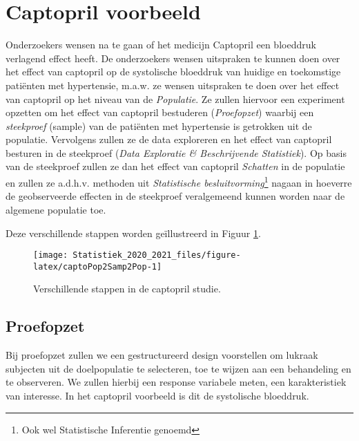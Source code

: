 \documentclass[
  12pt,dutch,coursenotes]{book}
\theoremstyle{definition}
\theoremstyle{definition}
\theoremstyle{definition}
\theoremstyle{remark}
\begin{document}
\hypertarget{captopril-voorbeeld}{%
\section{Captopril voorbeeld}\label{captopril-voorbeeld}}

Onderzoekers wensen na te gaan of het medicijn Captopril een bloeddruk verlagend effect heeft.
De onderzoekers wensen uitspraken te kunnen doen over het effect van captopril op de systolische bloeddruk van huidige en toekomstige patiënten met hypertensie, m.a.w. ze wensen uitspraken te doen over het effect van captopril op het niveau van de \emph{Populatie}.
Ze zullen hiervoor een experiment opzetten om het effect van captopril bestuderen (\emph{Proefopzet}) waarbij een \emph{steekproef} (sample) van de patiënten met hypertensie is getrokken uit de populatie.
Vervolgens zullen ze de data exploreren en het effect van captopril besturen in de steekproef (\emph{Data Exploratie \& Beschrijvende Statistiek}). Op basis van de steekproef zullen ze dan het effect van captopril \emph{Schatten} in de populatie en zullen ze a.d.h.v. methoden uit \emph{Statistische besluitvorming}\footnote{Ook wel Statistische Inferentie genoemd} nagaan in hoeverre de geobserveerde effecten in de steekproef veralgemeend kunnen worden naar de algemene populatie toe.

Deze verschillende stappen worden geïllustreerd in Figuur \ref{fig:captoPop2Samp2Pop}.

\begin{figure}

{\centering \texttt{[image: Statistiek\_2020\_2021\_files/figure-latex/captoPop2Samp2Pop-1]} 

}

\caption{Verschillende stappen in de captopril studie.}\label{fig:captoPop2Samp2Pop}
\end{figure}

\hypertarget{proefopzet}{%
\subsection{Proefopzet}\label{proefopzet}}

Bij proefopzet zullen we een gestructureerd design voorstellen om lukraak subjecten uit de doelpopulatie
te selecteren, toe te wijzen aan een behandeling en te observeren.
We zullen hierbij een response variabele meten, een karakteristiek van interesse. In het captopril voorbeeld is dit de systolische bloeddruk.
\end{document}
